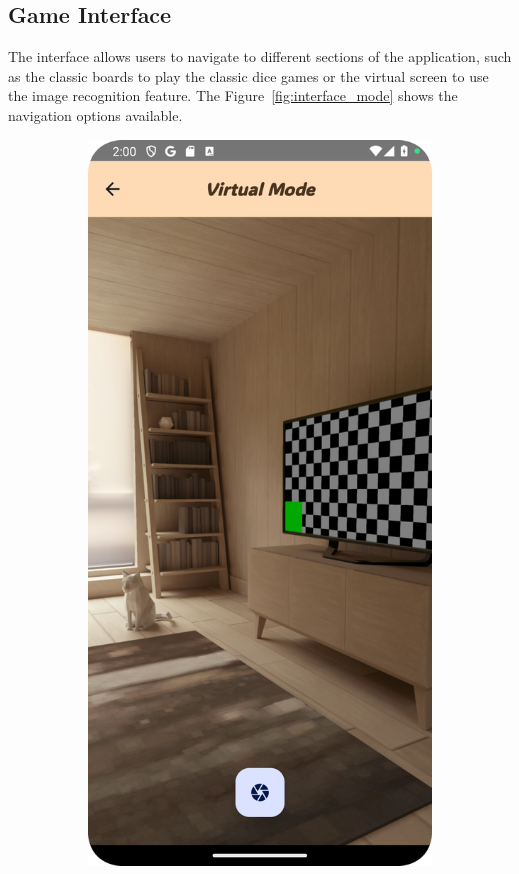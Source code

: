 \subsection{Game Interface}

The interface allows users to navigate to different sections of the application, such as the classic boards to play the classic dice games or the virtual screen to use the image recognition feature. The Figure~\ref{fig:interface_mode} shows the navigation options available.

\begin{figure}[ht!]
    \centering
    \begin{subfigure}[b]{0.27\textwidth}
        \includegraphics[width=\textwidth]{img/virtual mode.png}

\end{subfigure}
\end{figure}

